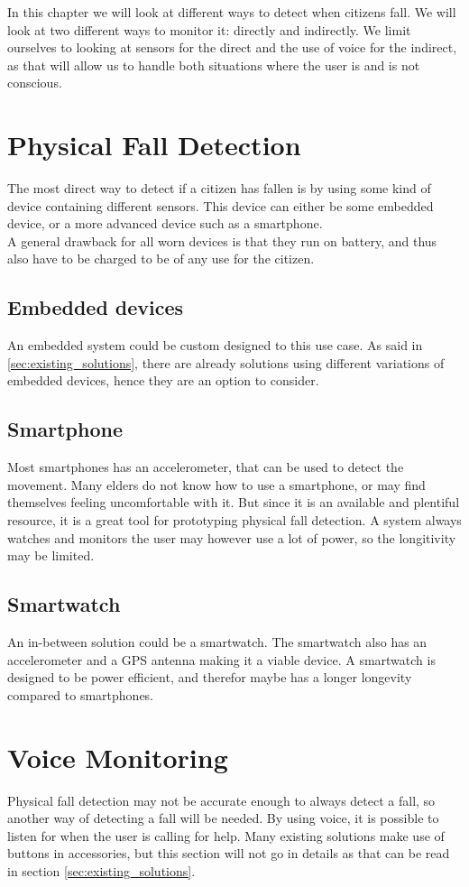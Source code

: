 In this chapter we will look at different ways to detect when citizens fall. We will look at two different ways to monitor it: directly and indirectly. We limit ourselves to looking at sensors for the direct and the use of voice for the indirect, as that will allow us to handle both situations where the user is and is not conscious.

\section{Physical Fall Detection}
The most direct way to detect if a citizen has fallen is by using some kind of device containing different sensors. This device can either be some embedded device, or a more advanced device such as a smartphone.\\
A general drawback for all worn devices is that they run on battery, and thus also have to be charged to be of any use for the citizen.

\subsection{Embedded devices}
An embedded system could be custom designed to this use case. As said in \ref{sec:existing_solutions}, there are already solutions using different variations of embedded devices, hence they are an option to consider.

\subsection{Smartphone}
Most smartphones has an accelerometer, that can be used to detect the movement. Many elders do not know how to use a smartphone, or may find themselves feeling uncomfortable with it. But since it is an available and plentiful resource, it is a great tool for prototyping physical fall detection. A system always watches and monitors the user may however use a lot of power, so the longitivity may be limited.

\subsection{Smartwatch}
An in-between solution could be a smartwatch. The smartwatch also has an accelerometer and a GPS antenna making it a viable device. A smartwatch is designed to be power efficient, and therefor maybe has a longer longevity compared to smartphones.


\section{Voice Monitoring}
Physical fall detection may not be accurate enough to always detect a fall, so another way of detecting a fall will be needed. By using voice, it is possible to listen for when the user is calling for help.
Many existing solutions make use of buttons in accessories, but this section will not go in details as that can be read in section \ref{sec:existing_solutions}.

